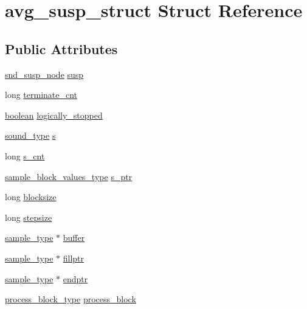 \hypertarget{structavg__susp__struct}{}\section{avg\+\_\+susp\+\_\+struct Struct Reference}
\label{structavg__susp__struct}
\subsection*{Public Attributes}
\begin{DoxyCompactItemize}
\item 
\hyperlink{sound_8h_a6b268203688a934bd798ceb55f85d4c0}{snd\+\_\+susp\+\_\+node} \hyperlink{structavg__susp__struct_a5b39c04319ca52603e77e0553371e998}{susp}
\item 
long \hyperlink{structavg__susp__struct_a1d06d493cddf115531181eea3e891bd0}{terminate\+\_\+cnt}
\item 
\hyperlink{cext_8h_a7670a4e8a07d9ebb00411948b0bbf86d}{boolean} \hyperlink{structavg__susp__struct_a4012d8bffd01a8a9f93cbfc52ee12a8d}{logically\+\_\+stopped}
\item 
\hyperlink{sound_8h_a792cec4ed9d6d636d342d9365ba265ea}{sound\+\_\+type} \hyperlink{structavg__susp__struct_a13f1d3ab79d8229157fd96a316641904}{s}
\item 
long \hyperlink{structavg__susp__struct_a7cd4b4430159354ea082a6782e94fbf6}{s\+\_\+cnt}
\item 
\hyperlink{sound_8h_a83d17f7b465d1591f27cd28fc5eb8a03}{sample\+\_\+block\+\_\+values\+\_\+type} \hyperlink{structavg__susp__struct_acc41ee9e062771780005352ec38f873e}{s\+\_\+ptr}
\item 
long \hyperlink{structavg__susp__struct_a58a62041a7b7aecfadd778e0b50312fa}{blocksize}
\item 
long \hyperlink{structavg__susp__struct_a6b8813ba1ed16caa28902e7cebfcf475}{stepsize}
\item 
\hyperlink{sound_8h_a3a9d1d4a1c153390d2401a6e9f71b32c}{sample\+\_\+type} $\ast$ \hyperlink{structavg__susp__struct_a6f0efa0e5bf554a78b8eb4b01d1e3ae4}{buffer}
\item 
\hyperlink{sound_8h_a3a9d1d4a1c153390d2401a6e9f71b32c}{sample\+\_\+type} $\ast$ \hyperlink{structavg__susp__struct_aebe3016ebac871ef4aef1add9d8d4487}{fillptr}
\item 
\hyperlink{sound_8h_a3a9d1d4a1c153390d2401a6e9f71b32c}{sample\+\_\+type} $\ast$ \hyperlink{structavg__susp__struct_a730f0d051b7ec1a7deae25e96f4d2aae}{endptr}
\item 
\hyperlink{avg_8c_a3fe762a2a43415fda8e2ebcee3aa2ad7}{process\+\_\+block\+\_\+type} \hyperlink{structavg__susp__struct_a0490e46d3810e05d9d719bf5647993f0}{process\+\_\+block}
\end{DoxyCompactItemize}


